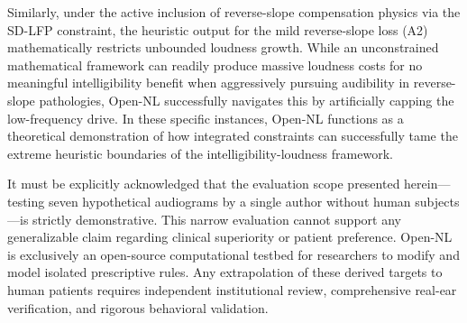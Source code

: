 \documentclass[
  12pt,
]{article}
\begin{document}
Similarly, under the active inclusion of reverse-slope compensation
physics via the SD-LFP constraint, the heuristic output for the mild
reverse-slope loss (A2) mathematically restricts unbounded loudness
growth. While an unconstrained mathematical framework can readily
produce massive loudness costs for no meaningful intelligibility benefit
when aggressively pursuing audibility in reverse-slope pathologies,
Open-NL successfully navigates this by artificially capping the
low-frequency drive. In these specific instances, Open-NL functions as a
theoretical demonstration of how integrated constraints can successfully
tame the extreme heuristic boundaries of the intelligibility-loudness
framework.

It must be explicitly acknowledged that the evaluation scope presented
herein---testing seven hypothetical audiograms by a single author
without human subjects---is strictly demonstrative. This narrow
evaluation cannot support any generalizable claim regarding clinical
superiority or patient preference. Open-NL is exclusively an open-source
computational testbed for researchers to modify and model isolated
prescriptive rules. Any extrapolation of these derived targets to human
patients requires independent institutional review, comprehensive
real-ear verification, and rigorous behavioral validation.
\end{document}
